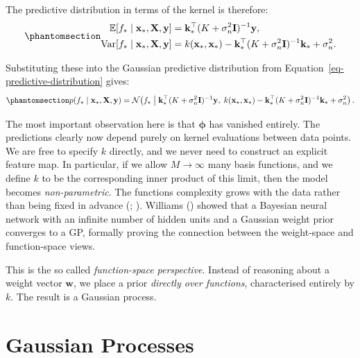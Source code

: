 \documentclass[
  letterpaper,
  DIV=11,
  numbers=noendperiod]{scrartcl}
\begin{document}
The predictive distribution in terms of the kernel is therefore:
\begin{equation}\phantomsection\label{eq-predictive-kernel}{
\begin{aligned}
\mathbb{E}[f_* \mid \mathbf{x}_*, \mathbf{X}, \mathbf{y}] &= \mathbf{k}_*^\top (K + \sigma_n^2 \mathbf{I})^{-1} \mathbf{y}, \\
\operatorname{Var}[f_* \mid \mathbf{x}_*, \mathbf{X}, \mathbf{y}] &= k(\mathbf{x}_*, \mathbf{x}_*) - \mathbf{k}_*^\top (K + \sigma_n^2 \mathbf{I})^{-1} \mathbf{k}_* + \sigma_n^2.
\end{aligned}
}\end{equation}

Substituting these into the Gaussian predictive distribution from
Equation~\ref{eq-predictive-distribution} gives:
\begin{equation}\phantomsection\label{eq-predictive-kernel-full}{
p(f_* \mid \mathbf{x}_*, \mathbf{X}, \mathbf{y}) = \mathcal{N}\!\left(f_* \;\middle|\; \mathbf{k}_*^\top(K + \sigma_n^2\mathbf{I})^{-1}\mathbf{y},\; k(\mathbf{x}_*,\mathbf{x}_*) - \mathbf{k}_*^\top(K+\sigma_n^2\mathbf{I})^{-1}\mathbf{k}_* + \sigma_n^2\right).
}\end{equation}

The most important observation here is that \(\boldsymbol{\phi}\) has
vanished entirely. The predictions clearly now depend purely on kernel
evaluations between data points. We are free to specify \(k\) directly,
and we never need to construct an explicit feature map. In particular,
if we allow \(M \to \infty\) many basis functions, and we define \(k\)
to be the corresponding inner product of this limit, then the model
becomes \emph{non-parametric}. The functions complexity grows with the
data rather than being fixed in advance
(;
). Williams
() showed that a Bayesian
neural network with an infinite number of hidden units and a Gaussian
weight prior converges to a GP, formally proving the connection between
the weight-space and function-space views.

This is the so called \emph{function-space perspective}. Instead of
reasoning about a weight vector \(\mathbf{w}\), we place a prior
\emph{directly over functions}, characterised entirely by \(k\). The
result is a Gaussian process.

\section{Gaussian Processes}\label{sec-gp-definition}
\end{document}
